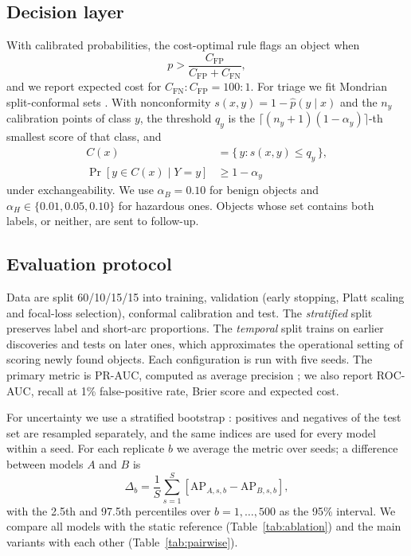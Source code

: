 \documentclass[journal]{IEEEtran}
\begin{document}
\begin{table}[t]
\caption{Model and evaluation settings (from the released configuration).}
\label{tab:hparams}
\centering
\footnotesize

\end{table}

\subsection{Decision layer}
With calibrated probabilities, the cost-optimal rule flags an object when
\begin{equation}
p > \frac{C_{\mathrm{FP}}}{C_{\mathrm{FP}}+C_{\mathrm{FN}}},
\end{equation}
and we report expected cost for $C_{\mathrm{FN}}:C_{\mathrm{FP}}=100:1$. For triage we fit Mondrian split-conformal sets \cite{vovk2005,angelopoulos2023}. With nonconformity $s(x,y)=1-\hat p(y\mid x)$ and the $n_y$ calibration points of class $y$, the threshold $q_y$ is the $\lceil (n_y+1)(1-\alpha_y)\rceil$-th smallest score of that class, and
\begin{align}
C(x) &= \{\, y : s(x,y)\le q_y \,\},\\
\Pr\!\left[y\in C(x)\mid Y=y\right] &\ge 1-\alpha_y
\end{align}
under exchangeability. We use $\alpha_B=0.10$ for benign objects and $\alpha_H\in\{0.01,0.05,0.10\}$ for hazardous ones. Objects whose set contains both labels, or neither, are sent to follow-up.

\subsection{Evaluation protocol}
Data are split 60/10/15/15 into training, validation (early stopping, Platt scaling and focal-loss selection), conformal calibration and test. The \emph{stratified} split preserves label and short-arc proportions. The \emph{temporal} split trains on earlier discoveries and tests on later ones, which approximates the operational setting of scoring newly found objects. Each configuration is run with five seeds. The primary metric is PR-AUC, computed as average precision \cite{davis2006,saito2015}; we also report ROC-AUC, recall at 1\% false-positive rate, Brier score and expected cost.

For uncertainty we use a stratified bootstrap \cite{efron1994}: positives and negatives of the test set are resampled separately, and the same indices are used for every model within a seed. For each replicate $b$ we average the metric over seeds; a difference between models $A$ and $B$ is
\begin{equation}
\Delta_b = \frac{1}{S}\sum_{s=1}^{S}\left[\mathrm{AP}_{A,s,b}-\mathrm{AP}_{B,s,b}\right],
\end{equation}
with the 2.5th and 97.5th percentiles over $b=1,\dots,500$ as the 95\% interval. We compare all models with the static reference (Table~\ref{tab:ablation}) and the main variants with each other (Table~\ref{tab:pairwise}).
\end{document}
